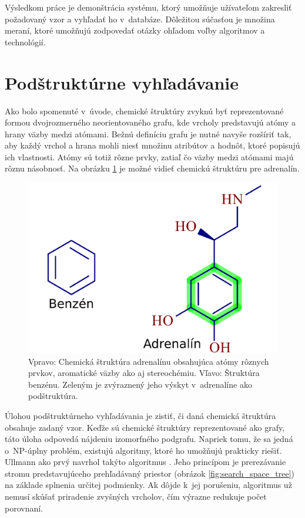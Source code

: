 \documentclass[slovak]{ExcelAtFIT} %
\begin{document}
Výsledkom práce je demonštrácia systému, ktorý umožňuje užívateľom zakresliť požadovaný vzor a vyhľadať ho v~databáze. Dôležitou súčasťou je množina meraní, ktoré umožňujú zodpovedať otázky ohľadom voľby algoritmov a technológií. 

\section{Podštruktúrne vyhľadávanie}
Ako bolo spomenuté v~úvode, chemické štruktúry zvyknú byť reprezentované formou dvojrozmerného neorientovaného grafu, kde vrcholy predstavujú atómy a hrany väzby medzi atómami. Bežnú definíciu grafu je nutné navyše rozšíriť tak, aby každý vrchol a hrana mohli niesť množinu atribútov a hodnôt, ktoré popisujú ich vlastnosti. Atómy sú totiž rôzne prvky, zatiaľ čo väzby medzi atómami majú rôznu násobnosť. Na obrázku \ref{fig:adrenaline} je možné vidieť chemickú štruktúru pre adrenalín. 

\begin{figure}[!htb]
	\centering
	\includegraphics[height=9\baselineskip]{images/adrenaline.pdf}
	\caption{Vpravo: Chemická štruktúra adrenalínu obsahujúca atómy rôznych prvkov, aromatické väzby ako aj stereochémiu. Vľavo: Štruktúra benzénu. Zeleným je zvýraznený jeho výskyt v~adrenalíne ako podštruktúra.}
	\label{fig:adrenaline}
\end{figure}

Úlohou podštruktúrneho vyhľadávania je zistiť, či daná chemická štruktúra obsahuje zadaný vzor. Keďže sú chemické štruktúry reprezentované ako grafy, táto úloha odpovedá nájdeniu izomorfného podgrafu. Napriek tomu, že sa jedná o~NP-úplny problém, existujú algoritmy, ktoré ho umožňujú prakticky riešiť. Ullmann ako prvý navrhol takýto algoritmus \cite{ullmann}. Jeho princípom je prerezávanie stromu predstavujúceho pre\-hľa\-dá\-va\-ný priestor (obrázok \ref{fig:search_space_tree}) na základe splnenia určitej podmienky. Ak dôjde k~jej porušeniu, algoritmus už nemusí skúšať priradenie zvyšných vrcholov, čím výrazne redukuje počet porovnaní. 
\end{document}
